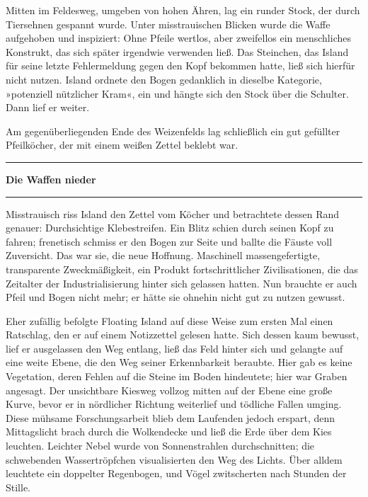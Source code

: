 Mitten im Feldesweg, umgeben von hohen Ähren, lag ein runder Stock, der durch Tiersehnen gespannt wurde. Unter misstrauischen Blicken wurde die Waffe aufgehoben und inspiziert: Ohne Pfeile wertlos, aber zweifellos ein menschliches Konstrukt, das sich später irgendwie verwenden ließ. Das Steinchen, das Island für seine letzte Fehlermeldung gegen den Kopf bekommen hatte, ließ sich hierfür nicht nutzen. Island ordnete den Bogen gedanklich in dieselbe Kategorie, »potenziell nützlicher Kram«, ein und hängte sich den Stock über die Schulter. Dann lief er weiter.

Am gegenüberliegenden Ende des Weizenfelds lag schließlich ein gut gefüllter Pfeilköcher, der mit einem weißen Zettel beklebt war.

\noindent \parbox{\textwidth}{ \vspace{3ex} \hrule \vspace{3ex}

\textbf{Die Waffen nieder}


\vspace{3ex} \hrule \vspace{3ex} }

Misstrauisch riss Island den Zettel vom Köcher und betrachtete dessen Rand genauer: Durchsichtige Klebestreifen. Ein Blitz schien durch seinen Kopf zu fahren; frenetisch schmiss er den Bogen zur Seite und ballte die Fäuste voll Zuversicht. Das war sie, die neue Hoffnung. Maschinell massengefertigte, transparente Zweckmäßigkeit, ein Produkt fortschrittlicher Zivilisationen, die das Zeitalter der Industrialisierung hinter sich gelassen hatten. Nun brauchte er auch Pfeil und Bogen nicht mehr; er hätte sie ohnehin nicht gut zu nutzen gewusst.

Eher zufällig befolgte Floating Island auf diese Weise zum ersten Mal einen Ratschlag, den er auf einem Notizzettel gelesen hatte. Sich dessen kaum bewusst, lief er ausgelassen den Weg entlang, ließ das Feld hinter sich und gelangte auf eine weite Ebene, die den Weg seiner Erkennbarkeit beraubte. Hier gab es keine Vegetation, deren Fehlen auf die Steine im Boden hindeutete; hier war Graben angesagt. Der unsichtbare Kiesweg vollzog mitten auf der Ebene eine große Kurve, bevor er in nördlicher Richtung weiterlief und tödliche Fallen umging. Diese mühsame Forschungsarbeit blieb dem Laufenden jedoch erspart, denn Mittagslicht brach durch die Wolkendecke und ließ die Erde über dem Kies leuchten. Leichter Nebel wurde von Sonnenstrahlen durchschnitten; die schwebenden Wassertröpfchen visualisierten den Weg des Lichts. Über alldem leuchtete ein doppelter Regenbogen, und Vögel zwitscherten nach Stunden der Stille.

